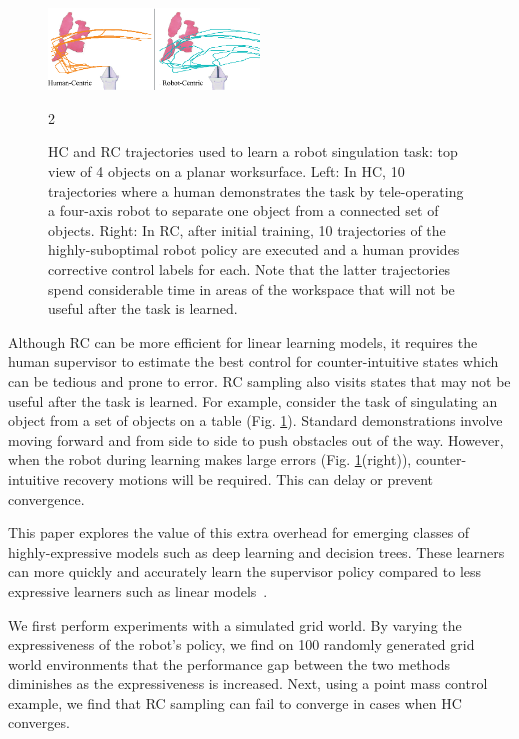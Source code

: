 \documentclass[10pt, conference]{ieeeconf}      %
\begin{document}
\begin{figure}
\center
\includegraphics[width=0.5\textwidth]{f_figs/teaser.eps}
\caption{
    \footnotesize
HC and RC trajectories used to learn a robot singulation task: top view of 4 objects on a planar worksurface.  Left: In HC, 10 trajectories where a human demonstrates the task by tele-operating a four-axis robot to separate one object from a connected set of objects. Right: In RC, after initial training, 10 trajectories of the highly-suboptimal robot policy are executed and a  human provides corrective control labels for each.  Note that the latter trajectories spend considerable time in areas of the workspace that will not be useful after the task is learned.}
\vspace*{-20pt}2
\label{fig:teaser}
\end{figure}

Although RC can be more efficient for linear learning models, it requires the human supervisor to estimate the best control for counter-intuitive states which can be tedious and prone to error.  RC sampling also visits states that may not be useful after the task is learned. For example, consider the task of singulating an object from a set of objects on a table (Fig. \ref{fig:teaser}). Standard demonstrations involve moving forward and from side to side to push obstacles out of the way. However, when the robot during learning makes large errors (Fig. \ref{fig:teaser}(right)), counter-intuitive recovery motions will be required.  This can delay or prevent convergence.
 
This paper explores the value of this extra overhead for emerging classes of highly-expressive models such as deep learning and decision trees. These learners can more quickly and accurately learn the supervisor policy compared to less expressive learners such as linear models~\cite{vapnik1992principles}.

We first perform experiments with a simulated grid world. By varying the expressiveness of the robot's policy, we find on 100 randomly generated grid world environments that the performance gap between the two methods diminishes as the expressiveness is increased. Next, using a point mass control example, we find that RC sampling can fail to converge in cases when HC converges.
\end{document}
